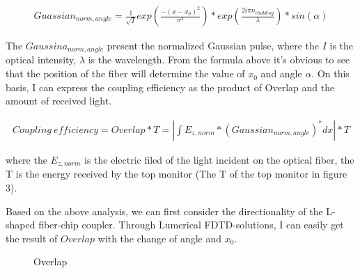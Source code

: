 \documentclass[]{article}
\begin{document}
\begin{align*}
	Guassian_{norm,angle} = \frac{1}{\sqrt{I}}exp(\frac{-(x-x_0)^2}{\sigma^2})*exp(\frac{2i\pi n_{cladding}}{\lambda})*sin(\alpha)
\end{align*}

The $Gaussina_{norm,angle}$ present the normalized Gaussian pulse, where the $I$ is the optical intensity, $\lambda$ is the wavelength. From the formula above it's obvious to see that the position of the fiber will determine the value of $x_0$ and angle $\alpha$. On this basis, I can express the coupling efficiency as the product of Overlap and the amount of received light.

\begin{align*}
	Coupling \ efficiency = Overlap*T = |\int E_{z,norm} * (Gaussian_{norm,angle})^*dx|*T
\end{align*}

where the $E_{z,norm}$ is the electric filed of the light incident on the optical fiber, the T is the energy received by the top monitor (The T of the top monitor in figure 3).

Based on the above analysis, we can first consider the directionality of the L-shaped fiber-chip coupler. Through Lumerical FDTD-solutions, I can easily get the result of $Overlap$ with the change of angle and $x_0$.

\begin{figure}[H]
	\centering
	\caption{Overlap}
	\label{fig:figure4}
\end{figure}
\end{document}
